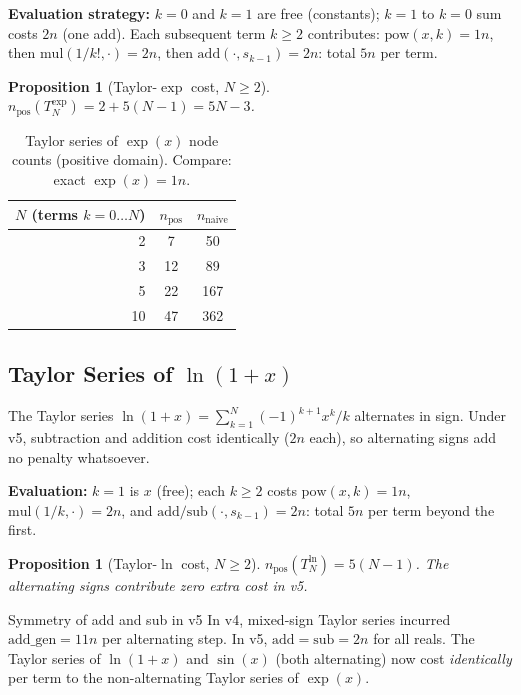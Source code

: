 \documentclass[11pt,a4paper]{article}
\newtheorem{proposition}[theorem]{Proposition}
\begin{document}
\textbf{Evaluation strategy:} $k=0$ and $k=1$ are free (constants); $k=1$ to $k=0$ sum
costs $2n$ (one add). Each subsequent term $k \geq 2$ contributes:
$\mathrm{pow}(x, k) = 1n$, then $\mathrm{mul}(1/k!, \cdot) = 2n$, then
$\mathrm{add}(\cdot, s_{k-1}) = 2n$: total $5n$ per term.

\begin{proposition}[Taylor-$\exp$ cost, $N \geq 2$]
  $n_\mathrm{pos}(T_N^{\exp}) = 2 + 5(N-1) = 5N - 3$.
\end{proposition}

\begin{table}[h]
\centering
\caption{Taylor series of $\exp(x)$ node counts (positive domain). Compare: exact $\exp(x) = 1n$.}
\label{tab:taylor_exp}
\begin{tabular}{rcc}
\toprule
$N$ (terms $k=0{\ldots}N$) & $n_\text{pos}$ & $n_\text{naive}$ \\
\midrule
2 & 7  & 50  \\
3 & 12 & 89  \\
5 & 22 & 167 \\
10 & 47 & 362 \\
\bottomrule
\end{tabular}
\end{table}

\subsection{Taylor Series of $\ln(1+x)$}

The Taylor series $\ln(1+x) = \sum_{k=1}^{N} (-1)^{k+1} x^k / k$ alternates in sign.
Under v5, subtraction and addition cost identically ($2n$ each), so alternating signs
add no penalty whatsoever.

\textbf{Evaluation:} $k=1$ is $x$ (free); each $k \geq 2$ costs
$\mathrm{pow}(x,k) = 1n$, $\mathrm{mul}(1/k, \cdot) = 2n$, and
$\mathrm{add/sub}(\cdot, s_{k-1}) = 2n$: total $5n$ per term beyond the first.

\begin{proposition}[Taylor-$\ln$ cost, $N \geq 2$]
  $n_\mathrm{pos}(T_N^{\ln}) = 5(N-1)$.
  The alternating signs contribute zero extra cost in v5.
\end{proposition}

\begin{findingbox}{Symmetry of add and sub in v5}
  In v4, mixed-sign Taylor series incurred $\text{add\_gen} = 11n$ per alternating step.
  In v5, $\text{add} = \text{sub} = 2n$ for all reals. The Taylor series of $\ln(1+x)$
  and $\sin(x)$ (both alternating) now cost \emph{identically} per term to the
  non-alternating Taylor series of $\exp(x)$.
\end{findingbox}
\end{document}
